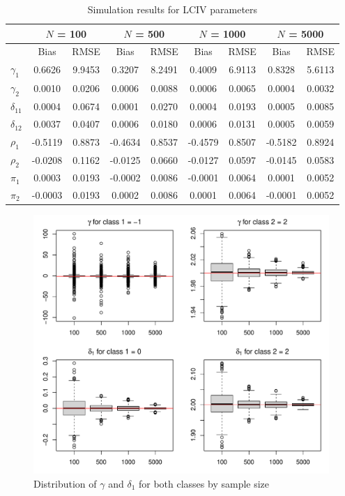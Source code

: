 \documentclass[12pt]{article}\usepackage[]{graphicx}\usepackage[]{xcolor}
\makeatletter
\def\maxwidth{ %
  \ifdim\Gin@nat@width>\linewidth
    \linewidth
  \else
    \Gin@nat@width
  \fi
}
\newenvironment{knitrout}{}{} %
\makeatother
\begin{document}
\begin{longtable}{lcccccccc}
\caption{Simulation results for LCIV parameters} \\ 
  \toprule & \multicolumn{2}{c}{$N$ = 100} & \multicolumn{2}{c}{$N$ = 500} & \multicolumn{2}{c}{$N$ = 1000} &  \multicolumn{2}{c}{$N$ = 5000} \\
 \toprule
 & Bias & RMSE & Bias & RMSE & Bias & RMSE & Bias & RMSE \\ 
  \midrule
$\gamma_{1}$ & 0.6626 & 9.9453 & 0.3207 & 8.2491 & 0.4009 & 6.9113 & 0.8328 & 5.6113 \\ 
  $\gamma_{2}$ & 0.0010 & 0.0206 & 0.0006 & 0.0088 & 0.0006 & 0.0065 & 0.0004 & 0.0032 \\ 
  $\delta_{11}$ & 0.0004 & 0.0674 & 0.0001 & 0.0270 & 0.0004 & 0.0193 & 0.0005 & 0.0085 \\ 
  $\delta_{12}$ & 0.0037 & 0.0407 & 0.0006 & 0.0180 & 0.0006 & 0.0131 & 0.0005 & 0.0059 \\ 
  $\rho_{1}$ & -0.5119 & 0.8873 & -0.4634 & 0.8537 & -0.4579 & 0.8507 & -0.5182 & 0.8924 \\ 
  $\rho_{2}$ & -0.0208 & 0.1162 & -0.0125 & 0.0660 & -0.0127 & 0.0597 & -0.0145 & 0.0583 \\ 
  $\pi_{1}$ & 0.0003 & 0.0193 & -0.0002 & 0.0086 & -0.0001 & 0.0064 & 0.0001 & 0.0052 \\ 
  $\pi_{2}$ & -0.0003 & 0.0193 & 0.0002 & 0.0086 & 0.0001 & 0.0064 & -0.0001 & 0.0052 \\ 
   \bottomrule
\end{longtable}



\begin{figure}[H]
 \caption{Distribution of $\gamma$ and $\delta_1$ for both classes by sample size}
 \centering
\begin{knitrout}
\color{fgcolor}
\includegraphics[width=\maxwidth]{figure/fig1c-1} 
\end{knitrout}
\end{figure}
\end{document}
